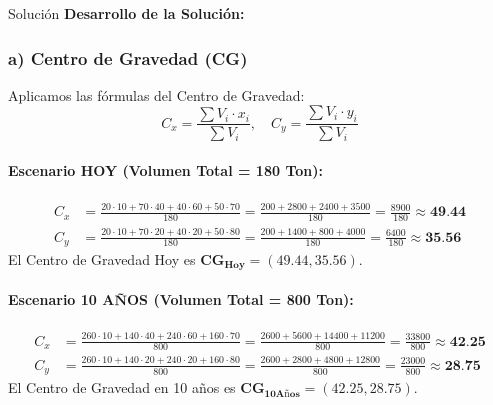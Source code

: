 \documentclass[11pt, a4paper]{article}
\begin{document}
  \medskip
  \begin{ejercicio}{Solución}
  \textbf{Desarrollo de la Solución:}

  \subsubsection*{a) Centro de Gravedad (CG)}
  Aplicamos las fórmulas del Centro de Gravedad:
  \begin{equation*}
    C_x = \frac{\sum V_i \cdot x_i}{\sum V_i}, \quad C_y = \frac{\sum V_i \cdot y_i}{\sum V_i}
  \end{equation*}

  \paragraph{Escenario HOY (Volumen Total = 180 Ton):}
  \begin{align*}
    C_x &= \frac{20 \cdot 10 + 70 \cdot 40 + 40 \cdot 60 + 50 \cdot 70}{180} = \frac{200 + 2800 + 2400 + 3500}{180} = \frac{8900}{180} \approx \textbf{49.44} \\
    C_y &= \frac{20 \cdot 10 + 70 \cdot 20 + 40 \cdot 20 + 50 \cdot 80}{180} = \frac{200 + 1400 + 800 + 4000}{180} = \frac{6400}{180} \approx \textbf{35.56}
  \end{align*}
  El Centro de Gravedad Hoy es $\mathbf{CG_{\text{Hoy}} = (49.44, 35.56)}$.

  \paragraph{Escenario 10 AÑOS (Volumen Total = 800 Ton):}
  \begin{align*}
    C_x &= \frac{260 \cdot 10 + 140 \cdot 40 + 240 \cdot 60 + 160 \cdot 70}{800} = \frac{2600 + 5600 + 14400 + 11200}{800} = \frac{33800}{800} \approx \textbf{42.25} \\
    C_y &= \frac{260 \cdot 10 + 140 \cdot 20 + 240 \cdot 20 + 160 \cdot 80}{800} = \frac{2600 + 2800 + 4800 + 12800}{800} = \frac{23000}{800} \approx \textbf{28.75}
  \end{align*}
  El Centro de Gravedad en 10 años es $\mathbf{CG_{\text{10Años}} = (42.25, 28.75)}$.


\end{ejercicio}
\end{document}
